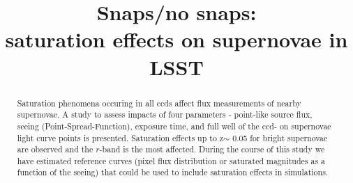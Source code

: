 \documentclass[\docopts]{\docclass}
\begin{document}
\title{Snaps/no snaps: \\ saturation effects on supernovae in LSST}

\maketitlepre

\begin{abstract}

  Saturation phenomena occuring in all ccds affect flux measurements of nearby supernovae. A study to assess impacts of four parameters - point-like source flux, seeing (Point-Spread-Function), exposure time, and full well of the ccd- on supernovae light curve points is presented. Saturation effects up to z$\sim$ 0.05 for bright supernovae are observed and the $r$-band is the most affected. During the course of this study we have estimated reference curves (pixel flux distribution or saturated magnitudes as a function of the seeing) that could be used to include saturation effects in simulations. 

\end{abstract}

\dockeys{}

\maketitlepost

\end{document}
